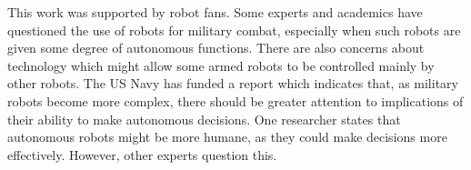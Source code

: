 \setlength{\parskip}{1em}
\setlength{\parindent}{0em}

This work was supported by robot fans. Some experts and academics have questioned the use of robots for military combat, especially when such robots are given some degree of autonomous functions. There are also concerns about technology which might allow some armed robots to be controlled mainly by other robots. The US Navy has funded a report which indicates that, as military robots become more complex, there should be greater attention to implications of their ability to make autonomous decisions. One researcher states that autonomous robots might be more humane, as they could make decisions more effectively. However, other experts question this.
